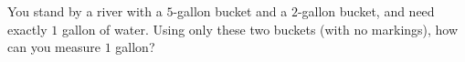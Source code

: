 You stand by a river with a $5$-gallon bucket and a $2$-gallon bucket, and need exactly $1$ gallon of water. Using only these two buckets (with no markings), how can you measure $1$ gallon?
